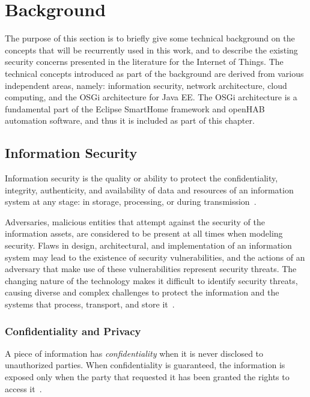 \documentclass[12pt]{article}
\newcommand{\TODO}{\todo[inline]}
\begin{document}

\newpage
\section{Background} 
\label{sec:art}
\TODO{SUMMARY}
The purpose of this section is to briefly give some technical background on the concepts that will be recurrently used in this work, and to describe the existing security concerns presented in the literature for the Internet of Things. The technical concepts introduced as part of the background are derived from various independent areas, namely: information security, network architecture, cloud computing, and the OSGi architecture for Java EE. The OSGi architecture is a fundamental part of the Eclipse SmartHome framework and openHAB automation software, and thus it is included as part of this chapter.

\subsection{Information Security}

Information security is the quality or ability to protect the confidentiality, integrity, authenticity, and availability of data and resources of an information system at any stage: in storage, processing, or during transmission~\cite{whitman2011principles}.

Adversaries, malicious entities that attempt against the security of the information assets, are considered to be present at all times when modeling security. Flaws in design, architectural, and implementation of an information system may lead to the existence of security vulnerabilities, and the actions of an adversary that make use of these vulnerabilities represent security threats. The changing nature of the technology makes it difficult to identify security threats, causing diverse and complex challenges to protect the information and the systems that process, transport, and store it~\cite{whitman2003}.

\subsubsection{Confidentiality and Privacy}

A piece of information has \emph{confidentiality} when it is never disclosed to unauthorized parties. When confidentiality is guaranteed, the information is exposed only when the party that requested it has been granted the rights to access it~\cite{whitman2011principles}.
\end{document}
